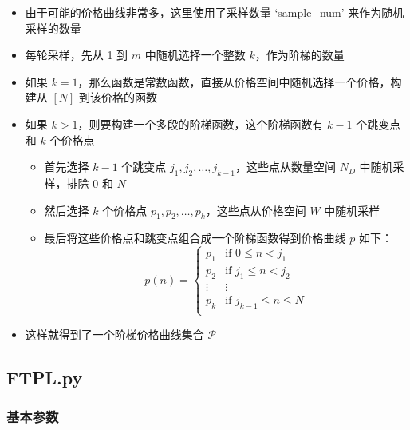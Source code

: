 \begin{itemize}
    \item 由于可能的价格曲线非常多，这里使用了采样数量 `sample_num' 来作为随机采样的数量
    \item 每轮采样，先从 1 到 $m$ 中随机选择一个整数 $k$，作为阶梯的数量
    \item 如果 $k = 1$，那么函数是常数函数，直接从价格空间中随机选择一个价格，构建从 $[N]$ 到该价格的函数
    \item 如果 $k > 1$，则要构建一个多段的阶梯函数，这个阶梯函数有 $k-1$ 个跳变点和 $k$ 个价格点
    \begin{itemize}
        \item 首先选择 $k-1$ 个跳变点 $j_1,j_2,\dots ,j_{k-1}$，这些点从数量空间 $N_D$ 中随机采样，排除 0 和 $N$
        \item 然后选择 $k$ 个价格点 $p_1,p_2,\dots ,p_k$，这些点从价格空间 $W$ 中随机采样
        \item 最后将这些价格点和跳变点组合成一个阶梯函数得到价格曲线 $p$ 如下：
        \[
            p(n) = 
            \begin{cases}
                p_1 & \text{if } 0 \leq n < j_1 \\
                p_2 & \text{if } j_1 \leq n < j_2 \\
                \vdots & \vdots \\
                p_k & \text{if } j_{k-1} \leq n \leq N \\
            \end{cases}
        \]
    \end{itemize}
    \item 这样就得到了一个阶梯价格曲线集合 $\overline{\mathcal{P}}$
\end{itemize}

\subsection{FTPL.py}

\subsubsection{基本参数}

